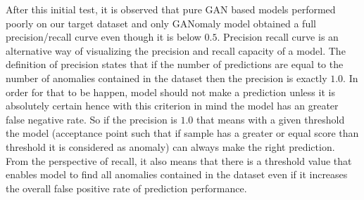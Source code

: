 After this initial test, it is observed that pure GAN based models performed poorly on our target dataset and 
only GANomaly model obtained a full precision/recall curve even though it is below $0.5$. Precision recall 
curve is an alternative way of visualizing the precision and recall capacity of a model. The definition of 
precision states that if the number of predictions are equal to the number of anomalies contained in the dataset then the 
precision is exactly $1.0$. In order for that to be happen, model should not make a prediction unless it is 
absolutely certain hence with this criterion in mind the model has an greater false negative rate. So if the 
precision is $1.0$ that means with a given threshold the model (acceptance point such that if sample has a greater or equal score than threshold it is considered as anomaly) can always make the right prediction. From the 
perspective of recall, it also means that there is a threshold value that enables model to find all anomalies 
contained in the dataset even if it increases the overall false positive rate of prediction performance.  

